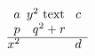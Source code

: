 \documentclass{article}
\begin{document}
\[\begin{array}{ccc} a & \omit $y^2$ text & c\\ p&\multicolumn{2}{l}{q^2+r}\\
\multispan{3}\hrulefill \\ \omit\span\omit $x^2$ & d \end{array}\]
\end{document}
